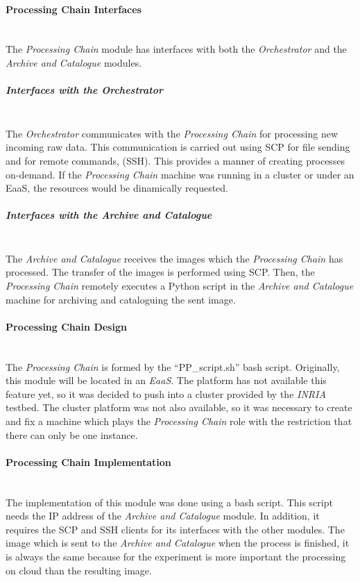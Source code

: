 \paragraph{Processing Chain Interfaces}~\\

The \emph{Processing Chain} module has interfaces with both the \emph{Orchestrator}
and the \emph{Archive and Catalogue} modules.
\subparagraph{Interfaces with the Orchestrator}~\\

The \emph{Orchestrator} communicates with the \emph{Processing Chain} for
processing new incoming raw data. This communication is carried out using \ac{SCP} for file sending and for remote commands, (\ac{SSH}). This provides a manner of creating processes
on-demand. If the \emph{Processing Chain} machine was running in a cluster or
under an \ac{EaaS}, the
resources would be dinamically requested. 

\subparagraph{Interfaces with the Archive and Catalogue}~\\

The \emph{Archive and Catalogue} receives the images which the \emph{Processing
  Chain} has processed. The transfer of the images is performed using \ac{SCP}. Then, the
\emph{Processing Chain} remotely executes a Python script in the \emph{Archive
  and Catalogue} machine for archiving and
cataloguing the sent image.

\paragraph{Processing Chain Design}~\\

The \emph{Processing Chain} is formed by the ``PP\_script.sh'' bash
script. Originally, this module will be located in an \emph{EaaS}. The \bonfire
platform has not available this feature yet, so it was decided to push into a
cluster provided by the \emph{INRIA} testbed. The cluster platform was not also
available, so it was necessary to create and fix a machine which plays the
\emph{Processing Chain} role with the restriction that there can only be one
instance. 

\paragraph{Processing Chain Implementation}~\\
\label{par:pp-impl}
The implementation of this module was done using a bash script. This script needs the
\ac{IP} address of the \emph{Archive and Catalogue} module. In addition, it
requires the \ac{SCP} and \ac{SSH} clients for its interfaces with the other
modules. The image which is sent to the \emph{Archive and Catalogue} when the
process is finished, it is always the
same because for the experiment is more important the processing on cloud than
the resulting image.
  
